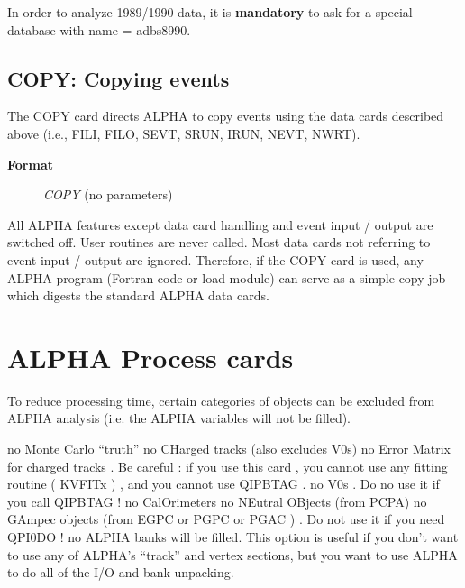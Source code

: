 In order to analyze 1989/1990 data, it is {\bf mandatory} to
 ask for a special database with name = adbs8990.
\par
\subsection{\label{sec-DCCOPY}COPY: Copying events}
\par
\par The COPY card directs ALPHA to copy events using the data cards
described above (i.e., FILI, FILO, SEVT, SRUN, IRUN, NEVT, NWRT).
\begin{description}\item[\bf{Format}]{\it COPY}  (no parameters)
\end{description}
\par All ALPHA features except data card handling and event input
/ output
are switched off. User routines are never called. Most data cards
not referring to event input / output are ignored.
Therefore, if the COPY card is used,
any ALPHA program (Fortran
code or load module) can serve as a simple copy job which
digests the standard ALPHA data cards.
\par
\section{\label{sec-DCPC}ALPHA Process cards}
\par
\par To reduce processing time, certain categories of objects can
be
excluded from ALPHA analysis (i.e. the ALPHA variables will not be filled).
\begin{indentlist}{ 2.50cm}{ 2.75cm}
no Monte Carlo ``truth''
no CHarged tracks (also excludes V0s)
no Error Matrix for charged tracks . Be careful : if you use this card ,
 you cannot use any fitting routine ( KVFITx ) , and you cannot use QIPBTAG .
no V0s . Do no use it if you call QIPBTAG !
no CalOrimeters
no NEutral OBjects (from PCPA)
no GAmpec objects (from EGPC or PGPC or PGAC ) . Do not use it if you need QPI0DO !
no ALPHA banks will be filled. This option is useful
if you
don't want to use any of ALPHA's ``track''
and vertex sections, but you want
to use ALPHA to do all of the I/O and bank unpacking.
\end{indentlist}
\par
